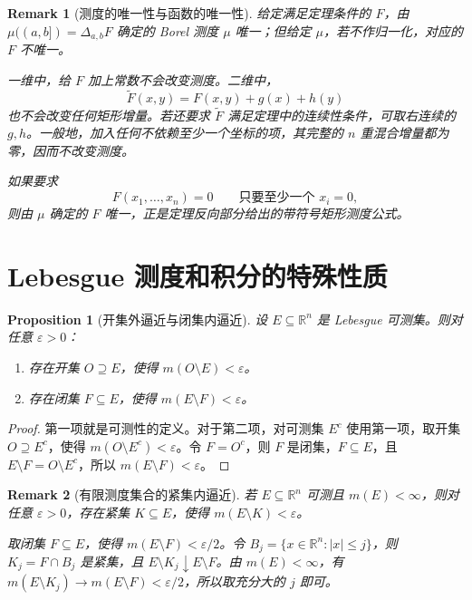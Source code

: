 \documentclass[12pt,letterpaper,twoside,openright]{ctexbook}
\theoremstyle{bluehead}
\newtheorem{proposition}[theorem]{Proposition}
\theoremstyle{olivehead}
\theoremstyle{orangehead}
\theoremstyle{redremark}
\newtheorem*{remark}{Remark}
\begin{document}
\begin{remark}[测度的唯一性与函数的唯一性]
给定满足定理条件的 $F$，由 $\mu((a,b])=\Delta_{a,b}F$ 确定的 Borel 测度 $\mu$ 唯一；但给定 $\mu$，若不作归一化，对应的 $F$ 不唯一。

一维中，给 $F$ 加上常数不会改变测度。二维中，
\[
\widetilde F(x,y)=F(x,y)+g(x)+h(y)
\]
也不会改变任何矩形增量。若还要求 $\widetilde F$ 满足定理中的连续性条件，可取右连续的 $g,h$。一般地，加入任何不依赖至少一个坐标的项，其完整的 $n$ 重混合增量都为零，因而不改变测度。

如果要求
\[
F(x_1,\ldots,x_n)=0\qquad\text{只要至少一个 }x_i=0,
\]
则由 $\mu$ 确定的 $F$ 唯一，正是定理反向部分给出的带符号矩形测度公式。
\end{remark}
\begin{center}
\setlength{\fboxsep}{12pt}
\end{center}
\section{Lebesgue 测度和积分的特殊性质}

\begin{proposition}[开集外逼近与闭集内逼近]\label{prop:lebesgue-open-closed-approx}
设 $E\subseteq\mathbb R^n$ 是 Lebesgue 可测集。则对任意 $\varepsilon>0$：
\begin{enumerate}
\item[(1)] 存在开集 $O\supseteq E$，使得 $m(O\setminus E)<\varepsilon$。
\item[(2)] 存在闭集 $F\subseteq E$，使得 $m(E\setminus F)<\varepsilon$。
\end{enumerate}
\end{proposition}

\begin{proof}
第一项就是可测性的定义。对于第二项，对可测集 $E^c$ 使用第一项，取开集 $O\supseteq E^c$，使得 $m(O\setminus E^c)<\varepsilon$。令 $F=O^c$，则 $F$ 是闭集，$F\subseteq E$，且 $E\setminus F=O\setminus E^c$，所以 $m(E\setminus F)<\varepsilon$。
\end{proof}
\begin{remark}[有限测度集合的紧集内逼近]\label{rem:lebesgue-compact-inner-approx}
若 $E\subseteq\mathbb R^n$ 可测且 $m(E)<\infty$，则对任意 $\varepsilon>0$，存在紧集 $K\subseteq E$，使得 $m(E\setminus K)<\varepsilon$。

取闭集 $F\subseteq E$，使得 $m(E\setminus F)<\varepsilon/2$。令 $B_j=\{x\in\mathbb R^n:|x|\leq j\}$，则 $K_j=F\cap B_j$ 是紧集，且 $E\setminus K_j\downarrow E\setminus F$。由 $m(E)<\infty$，有 $m(E\setminus K_j)\to m(E\setminus F)<\varepsilon/2$，所以取充分大的 $j$ 即可。
\end{remark}
\end{document}
